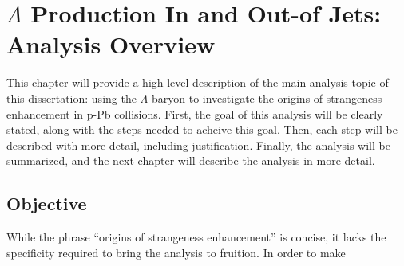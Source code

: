 \chapter{$\Lambda$ Production In and Out-of Jets: Analysis Overview}
This chapter will provide a high-level description of the main analysis topic of this dissertation: using the $\Lambda$ baryon to investigate the origins of strangeness enhancement in p-Pb collisions. First, the goal of this analysis will be clearly stated, along with the steps needed to acheive this goal. Then, each step will be described with more detail, including justification. Finally, the analysis will be summarized, and the next chapter will describe the analysis in more detail.

\section{Objective}
While the phrase ``origins of strangeness enhancement'' is concise, it lacks the specificity required to bring the analysis to fruition. In order to make 
